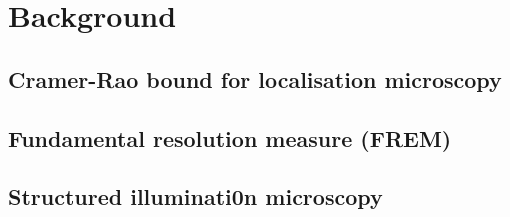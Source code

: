 \chapter{Background}



\section{Cramer-Rao bound for localisation microscopy}


\section{Fundamental resolution measure (FREM)}


\section{Structured illuminati0n microscopy}
